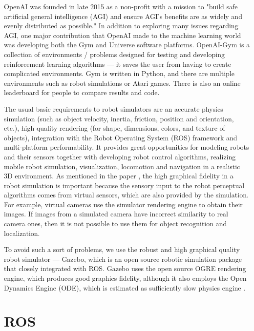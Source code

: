 
OpenAI was founded in late 2015 as a non-profit with a mission to "build safe artificial general intelligence (AGI) and ensure AGI's benefits are as widely and evenly distributed as possible." In addition to exploring many issues regarding AGI, one major contribution that OpenAI made to the machine learning world was developing both the Gym and Universe software platforms. OpenAI-Gym is a collection of environments / problems designed for testing and developing reinforcement learning algorithms --- it saves the user from having to create complicated environments. Gym is written in Python, and there are multiple environments such as robot simulations or Atari games. There is also an online leaderboard for people to compare results and code.



The usual basic requirements to robot simulators are an accurate physics simulation (such as object velocity, inertia, friction, position and orientation, etc.), high quality rendering (for shape, dimensions, colors, and texture of objects), integration with the Robot Operating System (ROS) framework and multi-platform performability. It provides great opportunities for modeling robots and their sensors together with developing robot control algorithms, realizing mobile robot simulation, visualization, locomotion and navigation in a realistic 3D environment. As mentioned in the paper \cite{jmeSim2012}, the high graphical fidelity in a robot simulation is important because the sensory input to the robot perceptual algorithms comes from virtual sensors, which are also provided by the simulation. For example, virtual cameras use the simulator rendering engine to obtain their images. If images from a simulated camera have incorrect similarity to real camera ones, then it is not possible to use them for object recognition and localization.

To avoid such a sort of problems, we use the robust and high graphical quality robot simulator --- Gazebo, which is an open source robotic simulation package that closely integrated with ROS. Gazebo uses the open source OGRE rendering engine, which produces good graphics fidelity, although it also employs the Open Dynamics Engine (ODE), which is estimated as sufficiently slow physics engine \cite{jmeSim2012}.

\section{ROS}

